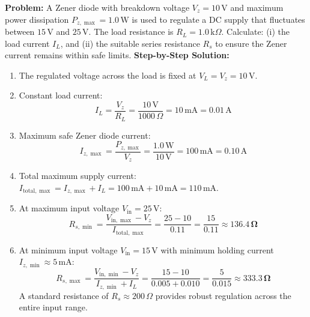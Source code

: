 \documentclass[10pt,a4paper]{article}
\begin{document}
\begin{usecasebox}
\textbf{Problem:} A Zener diode with breakdown voltage $V_z = 10\,\mathrm{V}$ and maximum power dissipation $P_{z,\max} = 1.0\,\mathrm{W}$ is used to regulate a DC supply that fluctuates between $15\,\mathrm{V}$ and $25\,\mathrm{V}$. The load resistance is $R_L = 1.0\,\mathrm{k}\Omega$. Calculate: (i) the load current $I_L$, and (ii) the suitable series resistance $R_s$ to ensure the Zener current remains within safe limits.
\textbf{Step-by-Step Solution:}
\begin{enumerate}
  \item The regulated voltage across the load is fixed at $V_L = V_z = 10\,\mathrm{V}$.
  \item Constant load current:
  \begin{equation}
    I_L = \frac{V_z}{R_L} = \frac{10\,\mathrm{V}}{1000\,\Omega} = 10\,\mathrm{mA} = 0.01\,\mathrm{A}
  \end{equation}
  \item Maximum safe Zener diode current:
  \begin{equation}
    I_{z,\max} = \frac{P_{z,\max}}{V_z} = \frac{1.0\,\mathrm{W}}{10\,\mathrm{V}} = 100\,\mathrm{mA} = 0.10\,\mathrm{A}
  \end{equation}
  \item Total maximum supply current: $I_{\text{total},\max} = I_{z,\max} + I_L = 100\,\mathrm{mA} + 10\,\mathrm{mA} = 110\,\mathrm{mA}$.
  \item At maximum input voltage $V_{\text{in}} = 25\,\mathrm{V}$:
  \begin{equation}
    R_{s,\min} = \frac{V_{\text{in},\max} - V_z}{I_{\text{total},\max}} = \frac{25 - 10}{0.11} = \frac{15}{0.11} \approx \mathbf{136.4\,\Omega}
  \end{equation}
  \item At minimum input voltage $V_{\text{in}} = 15\,\mathrm{V}$ with minimum holding current $I_{z,\min} \approx 5\,\mathrm{mA}$:
  \begin{equation}
    R_{s,\max} = \frac{V_{\text{in},\min} - V_z}{I_{z,\min} + I_L} = \frac{15 - 10}{0.005 + 0.010} = \frac{5}{0.015} \approx \mathbf{333.3\,\Omega}
  \end{equation}
  A standard resistance of $R_s \approx 200\,\Omega$ provides robust regulation across the entire input range.
\end{enumerate}
\end{usecasebox}
\end{document}
